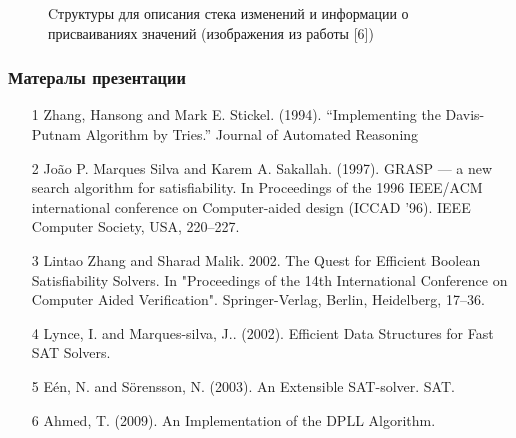 \documentclass[aspectratio=169,xcolor=table,english]{beamer}
\begin{document}
\begin{frame}[fragile]
\begin{minipage}[m]{0.45\linewidth}
\begin{figure}
\begin{subfigure}[b]{0.49\textwidth}
            \end{subfigure}
            \caption{Cтруктуры для описания стека изменений и информации о присваиваниях значений (изображения из работы [6])}
        \end{figure}
    \end{minipage}
\end{frame}

\begin{frame}[fragile] \frametitle{Матералы презентации}
    \begin{itemize}
        \item[1] Zhang, Hansong and Mark E. Stickel. (1994). “Implementing the Davis-Putnam Algorithm by Tries.” Journal of Automated Reasoning
        \item[2] João P. Marques Silva and Karem A. Sakallah. (1997). GRASP — a new search algorithm for satisfiability. In Proceedings of the 1996 IEEE/ACM international conference on Computer-aided design (ICCAD '96). IEEE Computer Society, USA, 220–227.
        \item[3] Lintao Zhang and Sharad Malik. 2002. The Quest for Efficient Boolean Satisfiability Solvers. In "Proceedings of the 14th International Conference on Computer Aided Verification". Springer-Verlag, Berlin, Heidelberg, 17–36.
        \item[4] Lynce, I. and Marques-silva, J.. (2002). Efficient Data Structures for Fast SAT Solvers. 
        \item[5] Eén, N. and Sörensson, N. (2003). An Extensible SAT-solver. SAT.
        \item[6] Ahmed, T. (2009). An Implementation of the DPLL Algorithm.
    \end{itemize}
\end{frame}
\end{document}
